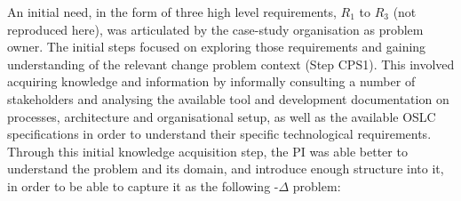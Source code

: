 \documentclass[runningheads,a4paper]{llncs}
\begin{document}

 An initial need, in the form of three high level requirements, $R_1$ to $R_3$ (not reproduced here), was articulated by the case-study organisation as problem owner. The initial steps focused on exploring those requirements and gaining understanding of the relevant change problem context (Step CPS1). This involved acquiring knowledge and information by informally consulting a number of stakeholders and analysing the available tool and development documentation on processes, architecture and organisational setup, as well as the available OSLC specifications in order to understand their specific technological requirements. Through this initial knowledge acquisition step, the PI was able better to understand the problem and its domain, and introduce enough structure into it, in order to be able to capture it as the following \POE{}-$\Delta$ problem:
\end{document}
